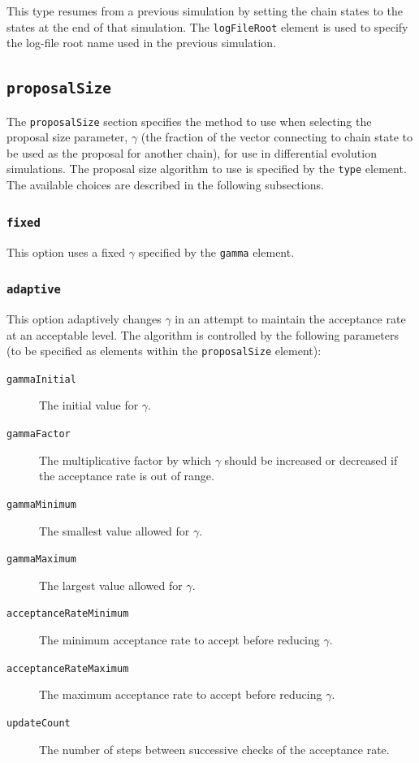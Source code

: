 This type resumes from a previous simulation by setting the chain states to the states at the end of that simulation. The {\tt logFileRoot} element is used to specify the log-file root name used in the previous simulation.

\subsection{{\tt proposalSize}}

The {\tt proposalSize} section specifies the method to use when selecting the proposal size parameter, $\gamma$ (the fraction of the vector connecting to chain state to be used as the proposal for another chain), for use in differential evolution simulations. The proposal size algorithm to use is specified by the {\tt type} element. The available choices are described in the following subsections.

\subsubsection{{\tt fixed}}

This option uses a fixed $\gamma$ specified by the {\tt gamma} element.

\subsubsection{{\tt adaptive}}

This option adaptively changes $\gamma$ in an attempt to maintain the acceptance rate at an acceptable level. The algorithm is controlled by the following parameters (to be specified as elements within the {\tt proposalSize} element):
\begin{description}
\item[{\tt gammaInitial}] The initial value for $\gamma$.
\item[{\tt gammaFactor}] The multiplicative factor by which $\gamma$ should be increased or decreased if the acceptance rate is out of range.
\item[{\tt gammaMinimum}] The smallest value allowed for $\gamma$.
\item[{\tt gammaMaximum}] The largest value allowed for $\gamma$.
\item[{\tt acceptanceRateMinimum}] The minimum acceptance rate to accept before reducing $\gamma$.
\item[{\tt acceptanceRateMaximum}] The maximum acceptance rate to accept before reducing $\gamma$.
\item[{\tt updateCount}] The number of steps between successive checks of the acceptance rate.
\end{description}

